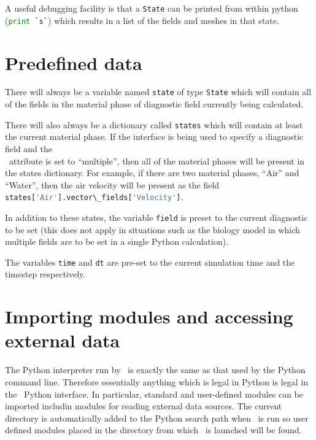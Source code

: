 A useful debugging facility is that a \lstinline[language=Python]+State+ can
be printed from within python (\lstinline[language=Python]+print `s`+) which
results in a list of the fields and meshes in that state.

\section{Predefined data}

 There will always be a variable named
\lstinline[language=Python]+state+ of type
\lstinline[language=Python]+State+ which will contain all of the fields in
the material phase of diagnostic field currently being calculated.

There will also always be a dictionary called \lstinline[language=Python]+states+
which will contain at least the current material phase. If the interface is
being used to specify a diagnostic field and the\\
\ attribute is set to
``multiple'', then all of the material phases will be present in the
states dictionary. For example, if there are two material phases, ``Air''
and ``Water'', then the air velocity will be present as the field
\lstinline[language=Python]+states['Air'].vector\_fields['Velocity']+. 

In addition to these states, the variable \lstinline[language=Python]+field+
is preset to the current diagnostic to be set (this does not apply in
situations such as the biology model in which multiple fields are to be set
in a single Python calculation). 

The variables \lstinline[language=Python]+time+ and
\lstinline[language=Python]+dt+ are pre-set to the current simulation time
and the timestep respectively.

\section{Importing modules and accessing external data}

The Python interpreter run by \fluidity\ is exactly the same as that used by
the Python command line. Therefore essentially anything which is legal in
Python is legal in the \fluidity\ Python interface. In particular, standard
and user-defined modules can be imported includin modules for reading
external data sources. The current directory is automatically added to the
Python search path when \fluidity\ is run so user defined modules placed in
the directory from which \fluidity\ is launched will be found.

